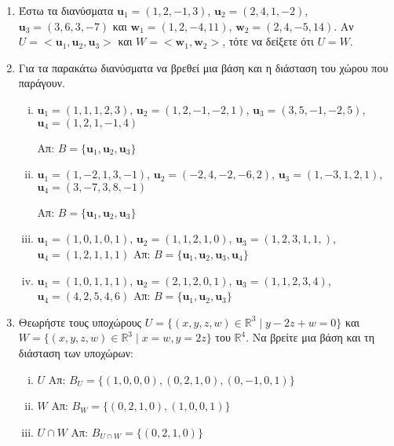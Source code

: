 \documentclass[a4paper,table]{report}
\begin{document}
\begin{enumerate}
  \item\label{ask:isoi} Έστω τα διανύσματα $ \mathbf{u}_{1} = (1,2,-1,3)$, 
    $\mathbf{u}_{2} = (2,4,1,-2)$, $ \mathbf{u} _{3} = (3,6,3,-7) $ και 
    $ \mathbf{w}_{1} = (1,2,-4,11)$, $ \mathbf{w}_{2} = (2,4,-5,14) $. 
    Αν $ U =  < \mathbf{u}_{1}, \mathbf{u}_{2}, \mathbf{u}_{3} > $ και 
    $ W =  < \mathbf{w}_{1}, \mathbf{w}_{2} > $, τότε να δείξετε ότι $ U=W $.

  \item\label{ask:parag2} Για τα παρακάτω διανύσματα να βρεθεί μια βάση και η διάσταση 
    του χώρου που παράγουν.
    \begin{enumerate}[(i)]
      \item $ \mathbf{u}_{1} = (1,1,1,2,3) $, $ \mathbf{u}_{2} = (1,2,-1,-2,1) $, 
        $ \mathbf{u} _{3} = (3,5,-1,-2,5) $, $ \mathbf{u}_{4} = (1,2,1,-1,4) $

        \hfill Απ: $ B = \{ \mathbf{u}_{1}, \mathbf{u}_{2}, \mathbf{u}_{3}\} $ 

      \item $ \mathbf{u}_{1} = (1,-2,1,3,-1) $, $ \mathbf{u}_{2} = (-2,4,-2,-6,2) $, $
        \mathbf{u}_{3} = (1,-3,1,2,1) $, $ \mathbf{u}_{4} = (3,-7,3,8,-1) $

        \hfill Απ: $ B = \{ \mathbf{u}_{1}, \mathbf{u}_{2}, \mathbf{u}_{3} \} $ 

      \item $ \mathbf{u}_{1} = (1,0,1,0,1) $, $ \mathbf{u}_{2} = (1,1,2,1,0) $, 
        $ \mathbf{u} _{3} = (1,2,3,1,1,) $, $ \mathbf{u}_{4} = (1,2,1,1,1) $
        \hfill Απ: $ B = \{ \mathbf{u}_{1}, \mathbf{u}_{2}, \mathbf{u}_{3}, 
        \mathbf{u}_{4} \} $ 

      \item $ \mathbf{u}_{1} = (1,0,1,1,1) $, $ \mathbf{u}_{2} = (2,1,2,0,1) $, 
        $ \mathbf{u} _{3} = (1,1,2,3,4) $, $ \mathbf{u}_{4} = (4,2,5,4,6) $
        \hfill Απ: $ B = \{ \mathbf{u}_{1}, \mathbf{u}_{2}, \mathbf{u}_{3} \} $ 
    \end{enumerate}

  \item Θεωρήστε τους υποχώρους 
    $ U = \{ (x,y,z,w) \in \mathbb{R}^{3} \mid y - 2z + w = 0 \} $ και 
    $ W = \{ (x,y,z,w) \in \mathbb{R}^{3} \mid x = w, y = 2z \} $ του 
    $\mathbb{R}^{4}$. Να βρείτε μια βάση και τη διάσταση των υποχώρων:
    \begin{enumerate}[(i)]
      \item $ U $ \hfill Απ: $ B_{U} = \{ (1,0,0,0), (0,2,1,0), (0,-1,0,1) \} $ 
      \item $ W $ \hfill Απ: $ B_{W} = \{ (0,2,1,0), (1,0,0,1) \} $ 
      \item $ U \cap W $ \hfill Απ: $ B_{U\cap W} = \{ (0,2,1,0) \} $ 
    \end{enumerate}	


\end{enumerate}
\end{document}
